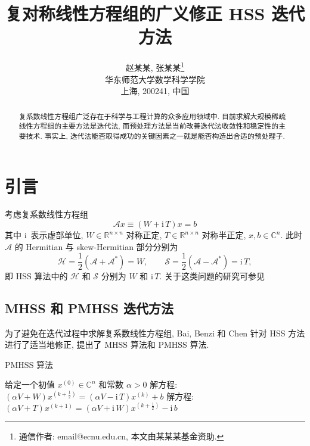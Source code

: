 \documentclass[UTF8]{ctexart}
\theoremstyle{plain}
\theoremstyle{nonumberplain}
\numberwithin{equation}{section} %
\newcommand{\CC}{\ensuremath{\mathbb{C}}}
\newcommand{\RR}{\ensuremath{\mathbb{R}}}
\newcommand{\A}{\mathcal{A}}
\newcommand{\ii}{\bm{\mathrm{i}}\,} %
\begin{document}
\title{复对称线性方程组的广义修正 HSS 迭代方法}

\author{赵某某, 张某某\thanks{通信作者: email@ecnu.edu.cn, 本文由某某某基金资助.} \\[1em]
  华东师范大学数学科学学院\\
  上海, 200241, 中国}

\date{}

\maketitle %

\begin{abstract}
复系数线性方程组广泛存在于科学与工程计算的众多应用领域中.
目前求解大规模稀疏线性方程组的主要方法是迭代法,
而预处理方法是当前改善迭代法收敛性和稳定性的主要技术.
事实上, 迭代法能否取得成功的关键因素之一就是能否构造出合适的预处理子.
\end{abstract}


\section{引言}
考虑复系数线性方程组
\begin{equation}\label{eq:problem}
  \A x \equiv (W + \ii T) x = b
\end{equation}
其中 $\ii$ 表示虚部单位, $W \in \RR^{n \times n}$ 对称正定, 
$T\in\RR^{n\times n}$ 对称半正定, $x, b\in\CC^n$.
此时 $\A $ 的 Hermitian 与 skew-Hermitian 部分分别为
$$
  \mathcal{H} = \frac12 (\A + \A^*) = W, \qquad 
  \mathcal{S} = \frac12 (\A - \A^{*}) = \ii T,
$$
即 HSS \cite{BGN03} 算法中的 $\mathcal{H}$ 和 $\mathcal{S}$ 分别为 $W$ 和 $\ii T$.
关于这类问题的研究可参见 \cite{BBC10,BBC11,NMP84,VM90}


\subsection{MHSS 和 PMHSS 迭代方法}
为了避免在迭代过程中求解复系数线性方程组,
Bai, Benzi 和 Chen \cite{BBC10, BBC11} 针对 HSS 方法进行了适当地修正,
提出了 MHSS 算法和 PMHSS 算法.  

\begin{algorithm}[H]
\caption{PMHSS 算法\label{Alg:PMHSS}}
\begin{algorithmic}[1]
  \State 给定一个初值 $ x^{(0)} \in \CC^{n} $  和常数 $\alpha>0$
  \State 解方程: $(\alpha V+W)x^{(k+\frac{1}{2})}=(\alpha V-\ii T)x^{(k)}+b $
  \State 解方程: $(\alpha V+T)x^{(k+1)}=(\alpha V+\ii W)x^{(k+\frac{1}{2})}-\ii b$
  \EndFor
\end{algorithmic}
\end{algorithm}
\end{document}
